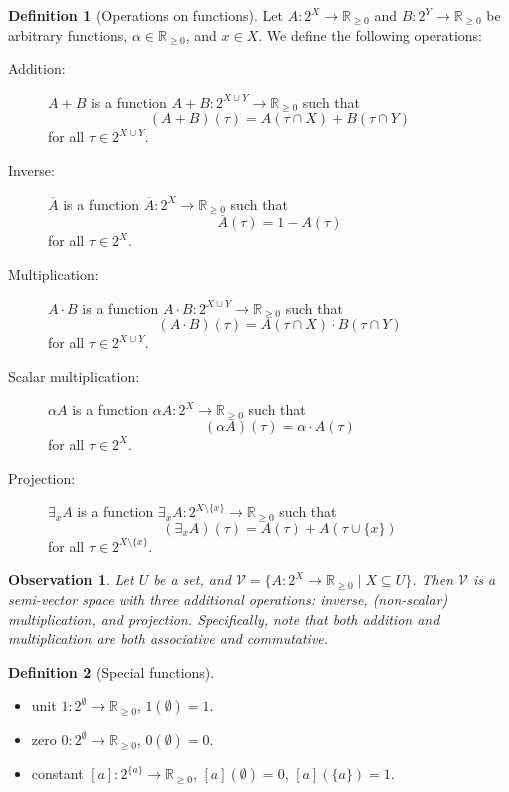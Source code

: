 \documentclass{article}
\newtheorem{observation}{Observation}
\theoremstyle{definition}
\newtheorem{definition}{Definition}
\theoremstyle{remark}
\begin{document}
\begin{definition}[Operations on functions]
  Let $A\colon 2^X \to \mathbb{R}_{\ge 0}$ and $B\colon 2^Y \to \mathbb{R}_{\ge
    0}$ be arbitrary functions, $\alpha \in \mathbb{R}_{\ge 0}$, and $x \in X$.
  We define the following operations:
  \begin{description}
  \item[Addition:] $A+B$ is a function $A+B\colon 2^{X \cup Y} \to
    \mathbb{R}_{\ge 0}$ such that
    \[
      (A+B)(\tau) = A(\tau \cap X) + B(\tau \cap Y)
    \]
    for all $\tau \in 2^{X \cup Y}$.
  \item[Inverse:] $\overline{A}$ is a function $\overline{A}\colon 2^X \to
    \mathbb{R}_{\ge 0}$ such that
    \[
      \overline{A}(\tau) = 1 - A(\tau)
    \]
    for all $\tau \in 2^X$.
  \item[Multiplication:] $A \cdot B$ is a function $A \cdot B\colon 2^{X \cup Y}
    \to \mathbb{R}_{\ge 0}$ such that
    \[
      (A \cdot B)(\tau) = A(\tau \cap X) \cdot B(\tau \cap Y)
    \]
    for all $\tau \in 2^{X \cup Y}$.
  \item[Scalar multiplication:] $\alpha A$ is a function $\alpha A\colon 2^X \to
    \mathbb{R}_{\ge 0}$ such that
    \[
      (\alpha A)(\tau) = \alpha \cdot A(\tau)
    \]
    for all $\tau \in 2^X$.
  \item[Projection:] $\exists_xA$ is a function $\exists_xA\colon 2^{X \setminus
      \{ x \}} \to \mathbb{R}_{\ge 0}$ such that
    \[
      (\exists_xA)(\tau) = A(\tau) + A(\tau \cup \{ x \})
    \]
    for all $\tau \in 2^{X \setminus \{x \}}$.
  \end{description}
\end{definition}

\begin{observation}
  Let $U$ be a set, and $\mathcal{V} = \{ A\colon 2^X \to \mathbb{R}_{\ge 0}
  \mid X \subseteq U \}$. Then $\mathcal{V}$ is a semi-vector space with three
  additional operations: inverse, (non-scalar) multiplication, and projection.
  Specifically, note that both addition and multiplication are both associative
  and commutative.
\end{observation}

\begin{definition}[Special functions]
  \phantom{}
  \begin{itemize}
  \item unit $1\colon 2^\emptyset \to \mathbb{R}_{\ge 0}$, $1(\emptyset) = 1$.
  \item zero $0\colon 2^\emptyset \to \mathbb{R}_{\ge 0}$, $0(\emptyset) = 0$.
  \item constant $[a]\colon 2^{\{a\}} \to \mathbb{R}_{\ge 0}$, $[a](\emptyset) =
    0$, $[a](\{a\}) = 1$.
  \end{itemize}
\end{definition}
\end{document}
